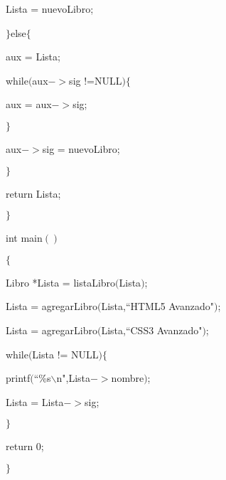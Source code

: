 \documentclass[]{article}
\begin{document}
	Lista = nuevoLibro;
	
	$\rbrace$else$\lbrace$
	
	aux = Lista;
	
	while$($aux$->$sig !=NULL$)$$\lbrace$
	
	aux = aux$->$sig;
	
	$\rbrace$
	
	aux$->$sig = nuevoLibro;
	
	$\rbrace$
	
	return Lista;
	
	$\rbrace$
	
	int main$()$
	
	$\lbrace$
	
	Libro *Lista = listaLibro$($Lista$)$;
	
	Lista = agregarLibro$($Lista,``HTML5 Avanzado"$)$;
	
	Lista = agregarLibro$($Lista,``CSS3 Avanzado"$)$;
	
	while$($Lista != NULL$)$$\lbrace$
	
	printf$($``\%s$\backslash$n",Lista$->$nombre$)$;
	
	Lista = Lista$->$sig;
	
	$\rbrace$
	
	return 0;
	
	$\rbrace$
	
\end{document}
